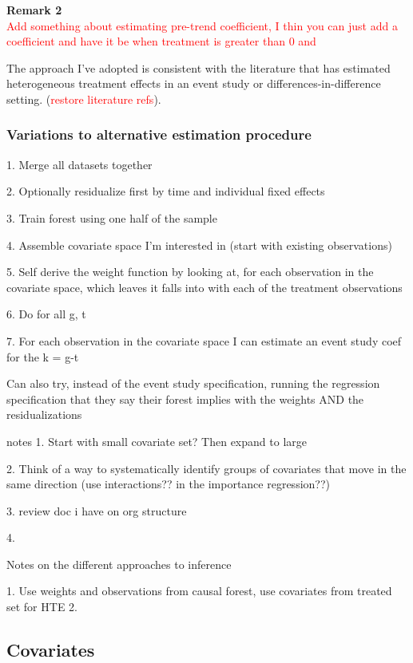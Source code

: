 \documentclass[source/paper/main.tex]{subfiles}
\begin{document}
\textbf{Remark 2}\\
\textcolor{red}{Add something about estimating pre-trend coefficient, I thin you can just add a coefficient and have it be when treatment is greater than 0 and }

The approach I've adopted is consistent with the literature that has estimated heterogeneous treatment effects in an event study or differences-in-difference setting. (\textcolor{red}{restore literature refs}).

\subsubsection{Variations to alternative estimation procedure}
1. Merge all datasets together

2. Optionally residualize first by time and individual fixed effects

3. Train forest using one half of the sample

4. Assemble covariate space I'm interested in (start with existing observations)

5. Self derive the weight function by looking at, for each observation in the covariate space, which leaves it falls into with each of the treatment observations 

6. Do for all g, t

7. For each observation in the covariate space I can estimate an event study coef for the k = g-t


Can also try, instead of the event study specification, running the regression specification that they say their forest implies with the weights AND the residualizations 

notes
1. Start with small covariate set? Then expand to large

2. Think of a way to systematically identify groups of covariates that move in the same direction (use interactions?? in the importance regression??)

3. review doc i have on org structure 

4. 


Notes on the different approaches to inference

1. Use weights and observations from causal forest, use covariates from treated set for HTE
2. 

\subsection{Covariates}
\end{document}
